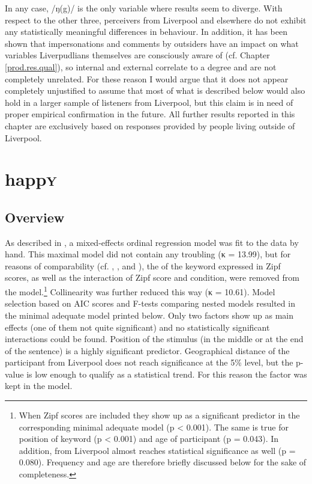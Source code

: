 In any case, /ŋ(g)/ is the only variable where results seem to diverge.
With respect to the other three, perceivers from Liverpool and elsewhere do not exhibit any statistically meaningful differences in behaviour.
In addition, it has been shown that impersonations and comments by outsiders have an impact on what variables Liverpudlians themselves are consciously aware of (cf. Chapter \ref{prod.res.qual}), so internal and external  correlate to a degree and are not completely unrelated.
For these reason I would argue that it does not appear completely unjustified to assume that most of what is described below would also hold in a larger sample of listeners from Liverpool, but this claim is in need of proper empirical confirmation in the future.
All further results reported in this chapter are exclusively based on responses provided by people living outside of Liverpool.

\section{happ\textsc{y}}
\label{sec.perc_res.happy}
	\subsection{Overview}
	\label{sec.perc_res.happy.overview}

As described in , a mixed-effects ordinal regression model was fit to the data by hand.
This maximal model did not contain any troubling  (κ = 13.99), but for reasons of comparability (cf. , , and ), the  of the keyword expressed in Zipf scores, as well as the interaction of Zipf score and  condition, were removed from the model.\footnote{When Zipf scores are included they show up as a significant predictor in the corresponding minimal adequate model (p < 0.001). The same is true for position of keyword (p < 0.001) and age of participant (p = 0.043). In addition,  from Liverpool almost reaches statistical significance as well (p = 0.080). Frequency and age are therefore briefly discussed below for the sake of completeness.}
Collinearity was further reduced this way (κ = 10.61).
Model selection based on AIC scores and F-tests comparing nested models resulted in the minimal adequate model printed below.
Only two factors show up as main effects (one of them not quite significant) and no statistically significant interactions could be found.
Position of the stimulus (in the middle or at the end of the sentence) is a highly significant predictor.
Geographical distance of the participant from Liverpool does not reach significance at the 5\% level, but the p-value is low enough to qualify as a statistical trend.
For this reason the factor was kept in the model.

